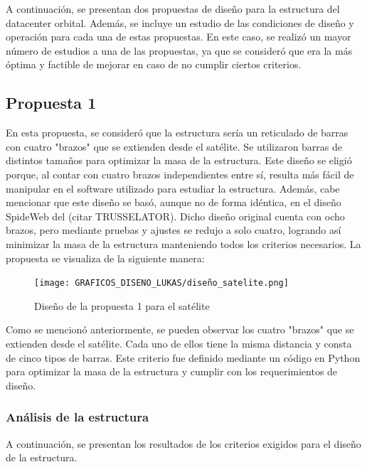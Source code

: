 A continuación, se presentan dos propuestas de diseño para la estructura del datacenter orbital. Además, se incluye un estudio de las condiciones de diseño y operación para cada una de estas propuestas. En este caso, se realizó un mayor número de estudios a una de las propuestas, ya que se consideró que era la más óptima y factible de mejorar en caso de no cumplir ciertos criterios.

\subsection{Propuesta 1}

En esta propuesta, se consideró que la estructura sería un reticulado de barras con cuatro "brazos" que se extienden desde el satélite. Se utilizaron barras de distintos tamaños para optimizar la masa de la estructura. Este diseño se eligió porque, al contar con cuatro brazos independientes entre sí, resulta más fácil de manipular en el software utilizado para estudiar la estructura. Además, cabe mencionar que este diseño se basó, aunque no de forma idéntica, en el diseño SpideWeb del (citar TRUSSELATOR). Dicho diseño original cuenta con ocho brazos, pero mediante pruebas y ajustes se redujo a solo cuatro, logrando así minimizar la masa de la estructura manteniendo todos los criterios necesarios. La propuesta se visualiza de la siguiente manera:

\begin{figure}[H]
    \centering
    \texttt{[image: GRAFICOS\_DISENO\_LUKAS/diseño\_satelite.png]}
    \caption{Diseño de la propuesta 1 para el satélite}
    \label{fig:propuesta1}
\end{figure}

Como se mencionó anteriormente, se pueden observar los cuatro "brazos" que se extienden desde el satélite. Cada uno de ellos tiene la misma distancia y consta de cinco tipos de barras. Este criterio fue definido mediante un código en Python para optimizar la masa de la estructura y cumplir con los requerimientos de diseño.

\subsubsection{Análisis de la estructura}

A continuación, se presentan los resultados de los criterios exigidos para el diseño de la estructura.

